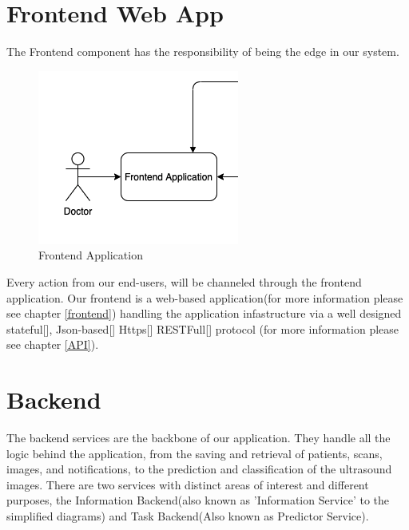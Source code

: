 	\section{Frontend Web App}
		The Frontend component has the responsibility of being the edge in our system.
		\begin{figure}[H]
			\iftrue
			\caption{Frontend Application}
			\centering
			\includegraphics[scale=0.5]{figures/frontend}
			\fi
		\end{figure}
		Every action from our end-users, will be channeled through the frontend application. Our frontend is a web-based application(for 
		more information please see chapter \ref{frontend}) handling the application infastructure via a well designed stateful[\cite{session-rfc6265}],
		Json-based[\cite{json-rfc7159}] Https[\cite{rfc2818}] RESTFull[\cite{restful-rfc7231}]
		protocol (for more information please see chapter \ref{API}).
	\section{Backend}
		The backend services are the backbone of our application. They handle all the logic behind the application, from the saving 
		and retrieval of patients, scans, images, and notifications, to the prediction and classification of the ultrasound images. 
		There are two services with distinct areas of interest and different purposes, the Information Backend(also known as 
		'Information Service' to the simplified diagrams) and Task Backend(Also known as Predictor Service).
